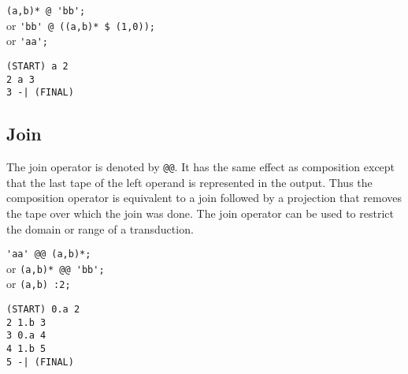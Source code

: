 \begin{center}\begin{minipage}[t]{3in}\begin{minipage}[t]{3in}\begin{tabbing}
\qquad \= \verb#(a,b)* @ 'bb';#\\
or \> \verb#'bb' @ ((a,b)* $ (1,0));#\\
or \> \verb#'aa';#
\end{tabbing}\end{minipage}\end{minipage}
\begin{minipage}[t]{1.6in}\begin{verbatim}
(START) a 2
2 a 3
3 -| (FINAL)
\end{verbatim}\end{minipage}\end{center}

\subsection{Join}
The join operator is denoted by \verb#@@#.
It has the same effect as composition except that the last tape of the left
operand is represented in the output.
Thus the composition operator is equivalent to a join followed by a
projection that removes the tape over which the join was done.
The join operator can be used to restrict the domain or range of a
transduction.
\begin{center}\begin{minipage}[t]{3in}\begin{minipage}[t]{3in}\begin{tabbing}
\qquad \= \verb#'aa' @@ (a,b)*;#\\
or \> \verb#(a,b)* @@ 'bb';#\\
or \> \verb#(a,b) :2;#
\end{tabbing}\end{minipage}\end{minipage}
\begin{minipage}[t]{1.6in}\begin{verbatim}
(START) 0.a 2
2 1.b 3
3 0.a 4
4 1.b 5
5 -| (FINAL)
\end{verbatim}\end{minipage}\end{center}

